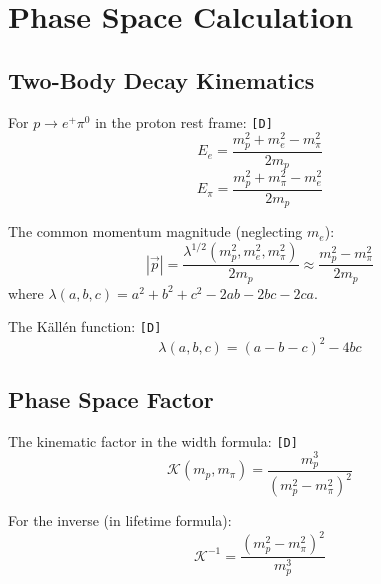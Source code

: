 \documentclass[11pt,a4paper]{article}
\newcommand{\tagD}{\textcolor{green!50!black}{\texttt{[D]}}}
\theoremstyle{definition}
\begin{document}
\section{Phase Space Calculation}
\label{app:phase-space}

\subsection{Two-Body Decay Kinematics}
\label{app:kinematics}

For $p \to e^+ \pi^0$ in the proton rest frame: \tagD{}
\begin{equation}
\label{eq:energy-e}
E_e = \frac{m_p^2 + m_e^2 - m_\pi^2}{2m_p}
\end{equation}
\begin{equation}
\label{eq:energy-pi}
E_\pi = \frac{m_p^2 + m_\pi^2 - m_e^2}{2m_p}
\end{equation}

The common momentum magnitude (neglecting $m_e$):
\begin{equation}
\label{eq:p-magnitude}
|\vec{p}| = \frac{\lambda^{1/2}(m_p^2, m_e^2, m_\pi^2)}{2m_p}
\approx \frac{m_p^2 - m_\pi^2}{2m_p}
\end{equation}
where $\lambda(a,b,c) = a^2 + b^2 + c^2 - 2ab - 2bc - 2ca$.

The K\"all\'en function: \tagD{}
\begin{equation}
\label{eq:kallen}
\lambda(a, b, c) = (a - b - c)^2 - 4bc
\end{equation}

\subsection{Phase Space Factor}
\label{app:ps-factor}

The kinematic factor in the width formula: \tagD{}
\begin{equation}
\label{eq:kinematic-factor}
\mathcal{K}(m_p, m_\pi) = \frac{m_p^3}{(m_p^2 - m_\pi^2)^2}
\end{equation}

For the inverse (in lifetime formula):
\begin{equation}
\label{eq:kinematic-inverse}
\mathcal{K}^{-1} = \frac{(m_p^2 - m_\pi^2)^2}{m_p^3}
\end{equation}
\end{document}
